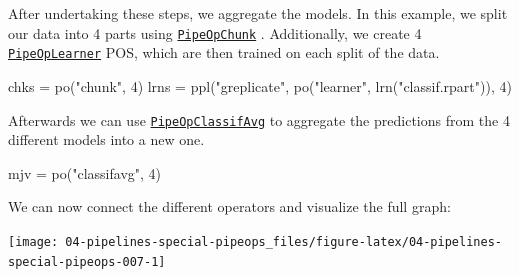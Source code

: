 \documentclass[
]{scrbook}
\newenvironment{Shaded}{\begin{snugshade}}{\end{snugshade}}
\newcommand{\AttributeTok}[1]{\textcolor[rgb]{0.77,0.63,0.00}{#1}}
\newcommand{\ConstantTok}[1]{\textcolor[rgb]{0.00,0.00,0.00}{#1}}
\newcommand{\DecValTok}[1]{\textcolor[rgb]{0.00,0.00,0.81}{#1}}
\newcommand{\FunctionTok}[1]{\textcolor[rgb]{0.00,0.00,0.00}{#1}}
\newcommand{\NormalTok}[1]{#1}
\newcommand{\OtherTok}[1]{\textcolor[rgb]{0.56,0.35,0.01}{#1}}
\newcommand{\SpecialCharTok}[1]{\textcolor[rgb]{0.00,0.00,0.00}{#1}}
\newcommand{\StringTok}[1]{\textcolor[rgb]{0.31,0.60,0.02}{#1}}
\renewenvironment{Shaded} {\begin{snugshade}\small} {\end{snugshade}}
\begin{document}
After undertaking these steps, we aggregate the models.
In this example, we split our data into 4 parts using \href{https://mlr3pipelines.mlr-org.com/reference/mlr_pipeops_chunk.html}{\texttt{PipeOpChunk}} .
Additionally, we create 4 \href{https://mlr3pipelines.mlr-org.com/reference/mlr_pipeops_learner.html}{\texttt{PipeOpLearner}} POS, which are then trained on each split of the data.

\begin{Shaded}
\begin{Highlighting}[]
\NormalTok{chks }\OtherTok{=} \FunctionTok{po}\NormalTok{(}\StringTok{"chunk"}\NormalTok{, }\DecValTok{4}\NormalTok{)}
\NormalTok{lrns }\OtherTok{=} \FunctionTok{ppl}\NormalTok{(}\StringTok{"greplicate"}\NormalTok{, }\FunctionTok{po}\NormalTok{(}\StringTok{"learner"}\NormalTok{, }\FunctionTok{lrn}\NormalTok{(}\StringTok{"classif.rpart"}\NormalTok{)), }\DecValTok{4}\NormalTok{)}
\end{Highlighting}
\end{Shaded}

Afterwards we can use \href{https://mlr3pipelines.mlr-org.com/reference/mlr_pipeops_classifavg.html}{\texttt{PipeOpClassifAvg}} to aggregate the predictions from the 4 different models into a new one.

\begin{Shaded}
\begin{Highlighting}[]
\NormalTok{mjv }\OtherTok{=} \FunctionTok{po}\NormalTok{(}\StringTok{"classifavg"}\NormalTok{, }\DecValTok{4}\NormalTok{)}
\end{Highlighting}
\end{Shaded}

We can now connect the different operators and visualize the full graph:

\begin{Shaded}
\end{Shaded}

\begin{center}\texttt{[image: 04-pipelines-special-pipeops\_files/figure-latex/04-pipelines-special-pipeops-007-1]} \end{center}
\end{document}
